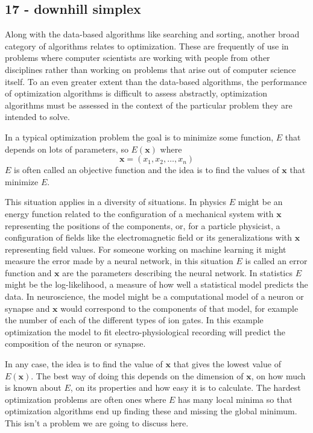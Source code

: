 \documentclass[11pt,a4paper]{scrartcl}
\begin{document}
\subsection*{17 - downhill simplex}

Along with the data-based algorithms like searching and sorting,
another broad category of algorithms relates to optimization. These
are frequently of use in problems where computer scientists are
working with people from other disciplines rather than working on
problems that arise out of computer science itself. To an even greater
extent than the data-based algorithms, the performance of optimization
algorithms is difficult to assess abstractly, optimization algorithms
must be assessed in the context of the particular problem they are
intended to solve.

In a typical optimization problem the goal is to minimize some
function, $E$ that depends on lots of parameters, so $E(\mathbf{x})$ where
\begin{equation}
\mathbf{x}=(x_1,x_2,\ldots,x_n)
\end{equation}
$E$ is often called an objective function and the idea is to find the values of $\mathbf{x}$ that minimize $E$.

This situation applies in a diversity of situations. In physics $E$
might be an energy function related to the configuration of a
mechanical system with $\mathbf{x}$ representing the positions of the
components, or, for a particle physicist, a configuration of fields
like the electromagnetic field or its generalizations with
$\mathbf{x}$ representing field values. For someone working on machine
learning it might measure the error made by a neural network, in this
situation $E$ is called an error function and $\mathbf{x}$ are the
parameters describing the neural network. In statistics $E$ might be
the log-likelihood, a measure of how well a statistical model predicts
the data. In neuroscience, the model might be a computational model of
a neuron or synapse and $\mathbf{x}$ would correspond to the
components of that model, for example the number of each of the
different types of ion gates. In this example optimization the model
to fit electro-physiological recording will predict the composition of
the neuron or synapse.

In any case, the idea is to find the value of $\mathbf{x}$ that gives
the lowest value of $E(\mathbf{x})$. The best way of doing this
depends on the dimension of $\mathbf{x}$, on how much is known about
$E$, on its properties and how easy it is to calculate. The hardest
optimization problems are often ones where $E$ has many local minima
so that optimization algorithms end up finding these and missing the
global minimum. This isn't a problem we are going to discuss here.
\end{document}
